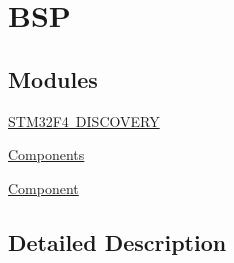 \hypertarget{group___b_s_p}{}\section{B\+SP}
\label{group___b_s_p}
\subsection*{Modules}
\begin{DoxyCompactItemize}
\item 
\mbox{\hyperlink{group___s_t_m32_f4___d_i_s_c_o_v_e_r_y}{S\+T\+M32\+F4 D\+I\+S\+C\+O\+V\+E\+RY}}
\item 
\mbox{\hyperlink{group___components}{Components}}
\item 
\mbox{\hyperlink{group___component}{Component}}
\end{DoxyCompactItemize}


\subsection{Detailed Description}
